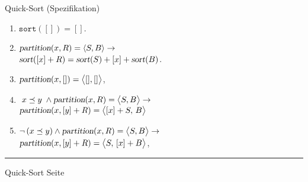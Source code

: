 \documentclass{slides}
\newcounter{mypage}
\begin{document}
\begin{slide}{}
\normalsize

\begin{center}
Quick-Sort (Spezifikation)
\end{center}

\footnotesize
\begin{enumerate}
\item $\mathtt{sort}([]) = []$.
\item $\textsl{partition}(x,R) = \langle S,B \rangle \rightarrow$
      \\[0.2cm]
      \hspace*{1.3cm}
      $\textsl{sort}([x] + R) = \textsl{sort}(S) + [x] + \textsl{sort}(B)$.
\item $\textsl{partition}(x, []) = \bigl\langle[], []\bigr\rangle$,
\item $\; x \preceq y\; \wedge \textsl{partition}(x,R) = \bigl\langle S, B \bigr\rangle \rightarrow$
      \\[0.2cm]
      \hspace*{2.3cm}
      $\textsl{partition}(x, [y] + R) = \bigl\langle [x] + S,\, B \bigr\rangle$
\item $\neg\, (x \preceq y) \wedge \textsl{partition}(x,R) = \bigl\langle S, B \bigr\rangle \rightarrow$
      \\[0.2cm]
      \hspace*{3.0cm}
      $\textsl{partition}(x, [y] + R) = \bigl\langle S,\, [x] + B \bigr\rangle$,
\end{enumerate}


\vspace*{\fill}
\tiny \addtocounter{mypage}{1}
\rule{17cm}{1mm}
Quick-Sort \hspace*{\fill} Seite 
\end{slide}

\end{document}
